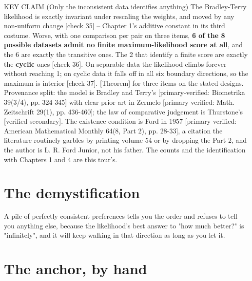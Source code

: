 \begin{whybox}{KEY CLAIM (Only the inconsistent data identifies anything)}
The Bradley-Terry likelihood is exactly invariant under rescaling the weights, and moved by any non-uniform change [check 35] -- Chapter 1's additive constant in its third costume. Worse, with one comparison per pair on three items, \textbf{6 of the 8 possible datasets admit no finite maximum-likelihood score at all}, and the 6 are exactly the transitive ones. The 2 that identify a finite score are exactly the \textbf{cyclic} ones [check 36]. On separable data the likelihood climbs forever without reaching 1; on cyclic data it falls off in all six boundary directions, so the maximum is interior [check 37]. [Theorem] for three items on the stated designs.
Provenance split: the model is Bradley and Terry's [primary-verified: Biometrika 39(3/4), pp. 324-345] with clear prior art in Zermelo [primary-verified: Math. Zeitschrift 29(1), pp. 436-460]; the law of comparative judgement is Thurstone's [verified-secondary]. The existence condition is Ford in 1957 [primary-verified: American Mathematical Monthly 64(8, Part 2), pp. 28-33], a citation the literature routinely garbles by printing volume 54 or by dropping the Part 2, and the author is L. R. Ford Junior, not his father. The counts and the identification with Chapters 1 and 4 are this tour's.
\end{whybox}

\section*{The demystification}

\begin{whyboxnt}
A pile of perfectly consistent preferences tells you the order and refuses to tell you anything else, because the likelihood's best answer to "how much better?" is "infinitely", and it will keep walking in that direction as long as you let it.
\end{whyboxnt}

\section*{The anchor, by hand}

